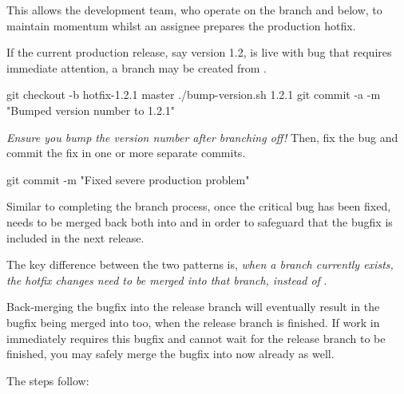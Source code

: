 This allows the development team, who operate on the  branch and below, to maintain momentum whilst an assignee prepares the production hotfix. \newline

If the current production release, say version 1.2, is live with bug that requires immediate attention, a  branch may be created from .

\begin{git-bash}
    git checkout -b hotfix-1.2.1 master
    ./bump-version.sh 1.2.1
    git commit -a -m "Bumped version number to 1.2.1"
\end{git-bash}

\emph{Ensure you bump the version number after branching off!} Then, fix the bug and commit the fix in one or more separate commits.

\begin{git-bash}
    git commit -m "Fixed severe production problem"
\end{git-bash}

Similar to completing the  branch process, once the critical bug has been fixed,  needs to be merged back both into  and  in order to safeguard that the bugfix is included in the next release.

The key difference between the two patterns is, \emph{when a  branch currently exists, the hotfix changes need to be merged into that  branch, instead of }.

Back-merging the bugfix into the release branch will eventually result in the bugfix being merged into  too, when the release branch is finished. If work in  immediately requires this bugfix and cannot wait for the release branch to be finished, you may safely merge the bugfix into  now already as well. \newline

\noindent The steps follow:


